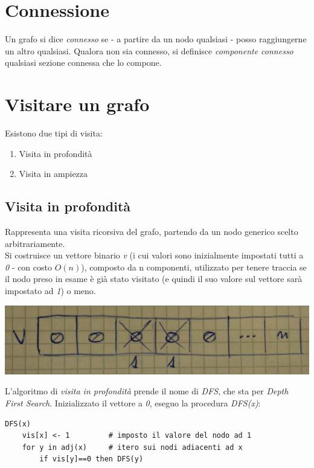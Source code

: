 \section{Connessione}
Un grafo si dice \textit{connesso} se - a partire da un nodo qualsiasi - posso raggiungerne un altro qualsiasi.
Qualora non sia connesso, si definisce \textit{componente connesso} qualsiasi sezione connessa che lo compone.

\section{Visitare un grafo}
Esistono due tipi di visita:
\begin{enumerate}
    \item Visita in profondità
    \item Visita in ampiezza
\end{enumerate}

\subsection{Visita in profondità}
Rappresenta una visita ricorsiva del grafo, partendo da un nodo generico scelto arbitrariamente. \\
Si costruisce un vettore binario \textit{v} (i cui valori sono inizialmente impostati tutti a \textit{0} - con costo $O(n)$), composto da n componenti, utilizzato per tenere traccia se il nodo preso in esame è già stato visitato (e quindi il suo valore sul vettore sarà impostato ad \textit{1}) o meno. \\
\begin{center}
    \includegraphics[width=.8\textwidth]{res/vettore-visita.jpg} \hfill
\end{center}
\newpage

L'algoritmo di \textit{visita in profondità} prende il nome di \textit{DFS}, che sta per \textit{Depth First Search}.
Inizializzato il vettore a \textit{0}, eseguo la procedura \textit{DFS(x)}:
\begin{lstlisting}
DFS(x)
    vis[x] <- 1         # imposto il valore del nodo ad 1
    for y in adj(x)     # itero sui nodi adiacenti ad x
        if vis[y]==0 then DFS(y)
\end{lstlisting}

